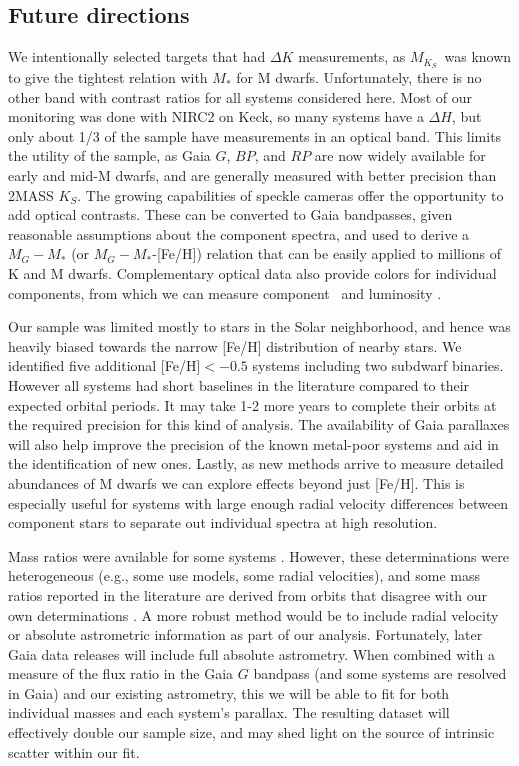 \documentclass[twocolumn]{aastex62}
\newcommand{\mks}{$M_{K_S}$}
\begin{document}
\subsection{Future directions}

We intentionally selected targets that had $\Delta K$ measurements, as \mks\ was known to give the tightest relation with $M_*$ for M dwarfs. Unfortunately, there is no other band with contrast ratios for all systems considered here. Most of our monitoring was done with NIRC2 on Keck, so many systems have a $\Delta H$, but only about 1/3 of the sample have measurements in an optical band. This limits the utility of the sample, as Gaia $G$, $BP$, and $RP$ are now widely available for early and mid-M dwarfs, and are generally measured with better precision than 2MASS $K_S$. The growing capabilities of speckle cameras \citep[e.g.,][]{2009AJ....137.5057H} offer the opportunity to add optical contrasts. These can be converted to Gaia bandpasses, given reasonable assumptions about the component spectra, and used to derive a $M_{G}-M_*$ (or $M_G-M_*$-[Fe/H]) relation that can be easily applied to millions of K and M dwarfs. Complementary optical data also provide colors for individual components, from which we can measure component \teff\ and luminosity \citep[e.g.,][]{2017ApJ...845...72K}.

Our sample was limited mostly to stars in the Solar neighborhood, and hence was heavily biased towards the narrow [Fe/H] distribution of nearby stars. We identified five additional [Fe/H]$<-0.5$ systems including two subdwarf binaries. However all systems had short baselines in the literature compared to their expected orbital periods. It may take 1-2 more years to complete their orbits at the required precision for this kind of analysis. The availability of Gaia parallaxes will also help improve the precision of the known metal-poor systems and aid in the identification of new ones. Lastly, as new methods arrive to measure detailed abundances of M dwarfs \citep{Veyette2016a,Veyette2017} we can explore effects beyond just [Fe/H]. This is especially useful for systems with large enough radial velocity differences between component stars to separate out individual spectra at high resolution.

Mass ratios were available for some systems  \citep[e.g.,][]{Soderhjelm1999,Mlg2007b,Dupuy2017}. However, these determinations were heterogeneous (e.g., some use models, some radial velocities), and some mass ratios reported in the literature are derived from orbits that disagree with our own determinations \citep[e.g.,][]{Koh2012}. A more robust method would be to include radial velocity or absolute astrometric information as part of our analysis. Fortunately, later Gaia data releases will include full absolute astrometry. When combined with a measure of the flux ratio in the Gaia $G$ bandpass (and some systems are resolved in Gaia) and our existing astrometry, this we will be able to fit for both individual masses and each system's parallax. The resulting dataset will effectively double our sample size, and may shed light on the source of intrinsic scatter within our fit. 
\end{document}
